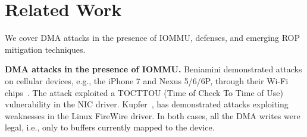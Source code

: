 \section{Related Work}
We cover DMA attacks in the presence of IOMMU, defenses, and emerging ROP mitigation techniques.

\smallskip
\noindent\textbf{DMA attacks in the presence of IOMMU.}
Beniamini demonstrated attacks on cellular devices, e.g., the iPhone 7 and Nexus 5/6/6P, through their Wi-Fi chips~\cite{Ben17a, Ben17b}. 
The attack exploited a TOCTTOU (Time of Check To Time of Use) vulnerability in the NIC driver. Kupfer~\cite{kupfer2018iommu}, has demonstrated \simple attacks exploiting weaknesses in the Linux FireWire driver. In both cases, all the DMA writes were legal, i.e., only to buffers currently mapped to the device.



